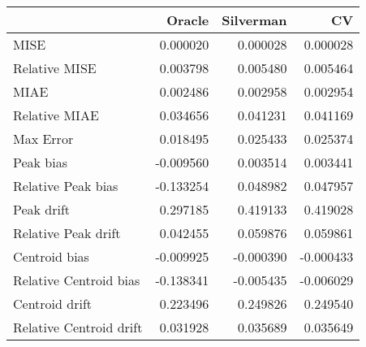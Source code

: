 \begin{tabular}{lrrr}
  \hline
 & Oracle & Silverman & CV \\ 
  \hline
MISE & 0.000020 & 0.000028 & 0.000028 \\ 
  Relative MISE & 0.003798 & 0.005480 & 0.005464 \\ 
  MIAE & 0.002486 & 0.002958 & 0.002954 \\ 
  Relative MIAE & 0.034656 & 0.041231 & 0.041169 \\ 
  Max Error & 0.018495 & 0.025433 & 0.025374 \\ 
  Peak bias & -0.009560 & 0.003514 & 0.003441 \\ 
  Relative Peak bias & -0.133254 & 0.048982 & 0.047957 \\ 
  Peak drift & 0.297185 & 0.419133 & 0.419028 \\ 
  Relative Peak drift & 0.042455 & 0.059876 & 0.059861 \\ 
  Centroid bias & -0.009925 & -0.000390 & -0.000433 \\ 
  Relative Centroid bias & -0.138341 & -0.005435 & -0.006029 \\ 
  Centroid drift & 0.223496 & 0.249826 & 0.249540 \\ 
  Relative Centroid drift & 0.031928 & 0.035689 & 0.035649 \\ 
   \hline
\end{tabular}
